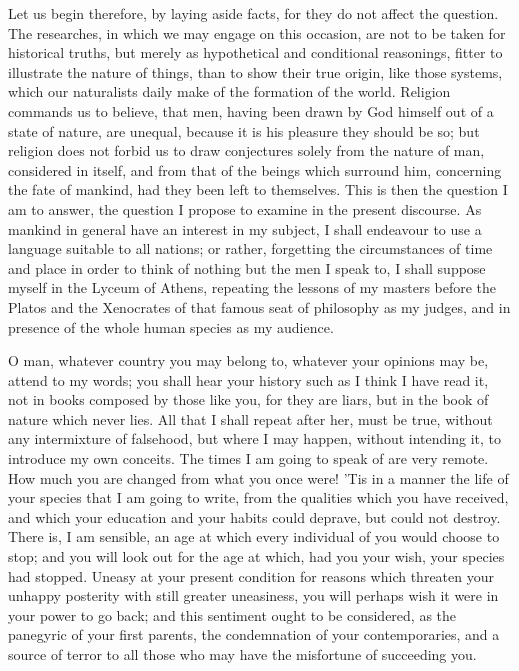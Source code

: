 \documentclass[11pt,twocolumn]{ltugboat}
\begin{document}
Let us begin therefore, by laying aside facts, for they do not affect
the question. The researches, in which we may engage on this occasion,
are not to be taken for historical truths, but merely as hypothetical
and conditional reasonings, fitter to illustrate the nature of things,
than to show their true origin, like those systems, which our
naturalists daily make of the formation of the world. Religion
commands us to believe, that men, having been drawn by God himself out
of a state of nature, are unequal, because it is his pleasure they
should be so; but religion does not forbid us to draw conjectures
solely from the nature of man, considered in itself, and from that of
the beings which surround him, concerning the fate of mankind, had
they been left to themselves. This is then the question I am to
answer, the question I propose to examine in the present discourse. As
mankind in general have an interest in my subject, I shall endeavour
to use a language suitable to all nations; or rather, forgetting the
circumstances of time and place in order to think of nothing but the
men I speak to, I shall suppose myself in the Lyceum of Athens,
repeating the lessons of my masters before the Platos and the
Xenocrates of that famous seat of philosophy as my judges, and in
presence of the whole human species as my audience.

O man, whatever country you may belong to, whatever your opinions may
be, attend to my words; you shall hear your history such as I think I
have read it, not in books composed by those like you, for they are
liars, but in the book of nature which never lies. All that I shall
repeat after her, must be true, without any intermixture of falsehood,
but where I may happen, without intending it, to introduce my own
conceits. The times I am going to speak of are very remote. How much
you are changed from what you once were! 'Tis in a manner the life of
your species that I am going to write, from the qualities which you
have received, and which your education and your habits could deprave,
but could not destroy. There is, I am sensible, an age at which every
individual of you would choose to stop; and you will look out for the
age at which, had you your wish, your species had stopped. Uneasy at
your present condition for reasons which threaten your unhappy
posterity with still greater uneasiness, you will perhaps wish it were
in your power to go back; and this sentiment ought to be considered,
as the panegyric of your first parents, the condemnation of your
contemporaries, and a source of terror to all those who may have the
misfortune of succeeding you.
\end{document}
